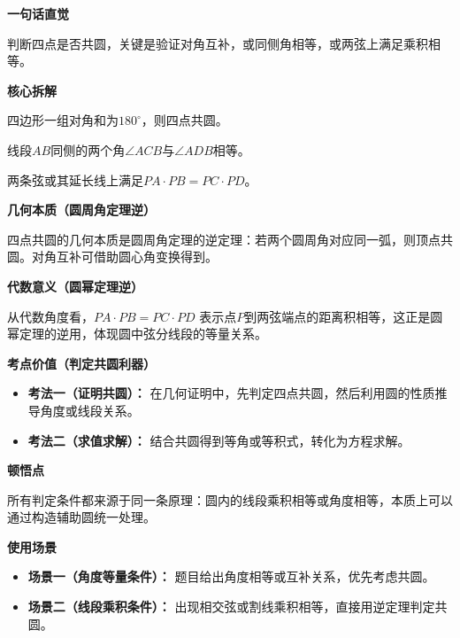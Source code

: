 \begin{explanationbox}
	\textbf{\textcolor{CExplanation}{一句话直觉}}

	判断四点是否共圆，关键是验证对角互补，或同侧角相等，或两弦上满足乘积相等。

	\medskip
	\textbf{\textcolor{CExplanation}{核心拆解}}
	\begin{description}[style=nextline, leftmargin=2.8em, labelsep=0.5em, itemsep=0.45em]
		\item[\textbf{要点一（对角互补）：}] 四边形一组对角和为$180^{\circ}$，则四点共圆。
		\item[\textbf{要点二（同侧等角）：}] 线段$AB$同侧的两个角$\angle ACB$与$\angle ADB$相等。
		\item[\textbf{要点三（圆幂逆定理）：}] 两条弦或其延长线上满足$PA\cdot PB = PC\cdot PD$。
	\end{description}

	\medskip
	\textbf{\textcolor{CExplanation}{几何本质（圆周角定理逆）}}

	四点共圆的几何本质是圆周角定理的逆定理：若两个圆周角对应同一弧，则顶点共圆。对角互补可借助圆心角变换得到。

	\medskip
	\textbf{\textcolor{CExplanation}{代数意义（圆幂定理逆）}}

	从代数角度看，$PA\cdot PB = PC\cdot PD$ 表示点$P$到两弦端点的距离积相等，这正是圆幂定理的逆用，体现圆中弦分线段的等量关系。

	\medskip
	\textbf{\textcolor{CExplanation}{考点价值（判定共圆利器）}}
	\begin{itemize}[leftmargin=*, itemsep=0.5em, topsep=0.4em]
		\item \textbf{考法一（证明共圆）：} 在几何证明中，先判定四点共圆，然后利用圆的性质推导角度或线段关系。
		\item \textbf{考法二（求值求解）：} 结合共圆得到等角或等积式，转化为方程求解。
	\end{itemize}

	\medskip
	\textbf{\textcolor{CExplanation}{顿悟点}}

	所有判定条件都来源于同一条原理：圆内的线段乘积相等或角度相等，本质上可以通过构造辅助圆统一处理。

	\medskip
	\textbf{\textcolor{CExplanation}{使用场景}}
	\begin{itemize}[leftmargin=*, itemsep=0.5em, topsep=0.4em]
		\item \textbf{场景一（角度等量条件）：} 题目给出角度相等或互补关系，优先考虑共圆。
		\item \textbf{场景二（线段乘积条件）：} 出现相交弦或割线乘积相等，直接用逆定理判定共圆。
	\end{itemize}
\end{explanationbox}
